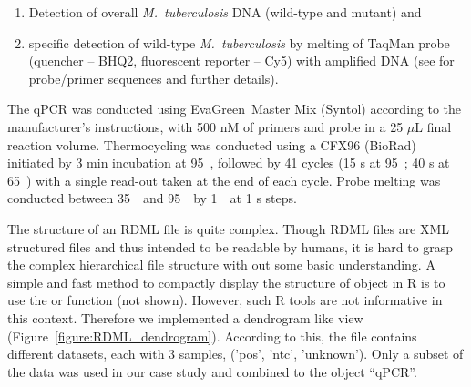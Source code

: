 \begin{enumerate}
 \item Detection of overall \textit{M.~tuberculosis} DNA (wild-type 
and mutant) and
 \item specific detection of wild-type \textit{M.~tuberculosis} by melting of 
TaqMan probe (quencher -- BHQ2, fluorescent reporter -- Cy5) with amplified DNA 
(see \citet{luo_multiplex_2011} for probe/primer sequences and further details).
\end{enumerate}

The qPCR was conducted using EvaGreen\circledR~Master Mix (Syntol) according to 
the manufacturer's instructions, with 500 nM of primers and probe in a 25 $\mu$L 
final reaction volume. Thermocycling was conducted using a CFX96 (BioRad) 
initiated by 3 min incubation at 95~\textcelsius, followed by 41 cycles (15 s at 
95~\textcelsius; 40 s at 65~\textcelsius) with a single read-out taken at the 
end of each cycle. Probe melting was conducted between 35~\textcelsius~and 
95~\textcelsius~by 1~\textcelsius~at 1 s steps.

The structure of an RDML file is quite complex. Though RDML files are XML 
structured files and thus intended to be readable by humans, it is hard to grasp 
the complex hierarchical file structure with out some basic understanding. A 
simple and fast method to compactly display the structure of object in R is to 
use the  or  function (not shown). However, such R tools 
are not informative in this context. Therefore we implemented a dendrogram like 
view (Figure~\ref{figure:RDML_dendrogram}). According to this, the file contains 
different datasets, each with 3 samples, ('pos',  'ntc', 'unknown'). Only a 
subset of the data was used in our case study and combined to the object 
``qPCR''.


